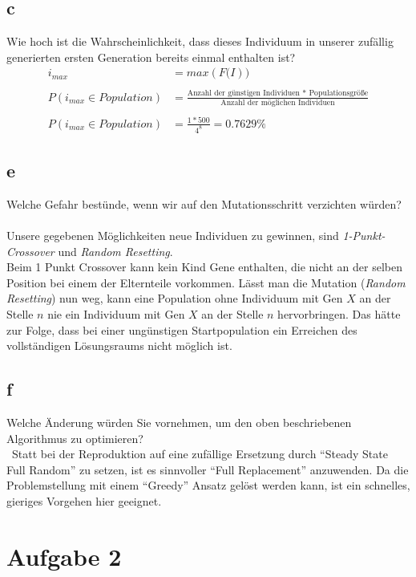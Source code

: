 \documentclass[12pt, a4paper]{article}
\begin{document}
\subsection*{c}
Wie hoch ist die Wahrscheinlichkeit, dass dieses Individuum in unserer zufällig generierten ersten Generation bereits einmal enthalten ist?\\
\begin{align*}
i_{max} &= max(F\mathbb(I)) \\\\
P(i_{max}\in Population) &= \frac{\text{Anzahl der günstigen Individuen * Populationsgröße}}{\text{Anzahl der möglichen Individuen}} \\\\
P(i_{max}\in Population) &= \frac{1*500}{4^8} = 0.7629\%
\end{align*}

\subsection*{e}
Welche Gefahr bestünde, wenn wir auf den Mutationsschritt verzichten würden?\\\\
Unsere gegebenen Möglichkeiten neue Individuen zu gewinnen, sind \textit{1-Punkt-Crossover} und \textit{Random Resetting}.\\
Beim 1 Punkt Crossover kann kein Kind Gene enthalten, die nicht an der selben Position bei einem der Elternteile vorkommen. Lässt man die Mutation (\textit{Random Resetting}) nun weg, kann eine Population ohne Individuum mit Gen $X$ an der Stelle $n$ nie ein Individuum mit Gen $X$ an der Stelle $n$ hervorbringen. Das hätte zur Folge, dass bei einer ungünstigen Startpopulation ein Erreichen des vollständigen Lösungsraums nicht möglich ist.

\subsection*{f}
Welche Änderung würden Sie vornehmen, um den oben beschriebenen Algorithmus zu optimieren?\\\
Statt bei der Reproduktion auf eine zufällige Ersetzung durch ``Steady
State Full Random'' zu setzen, ist es sinnvoller ``Full Replacement''
anzuwenden. Da die Problemstellung mit einem ``Greedy'' Ansatz gelöst
werden kann, ist ein schnelles, gieriges Vorgehen hier geeignet.

\section*{Aufgabe 2}
\end{document}
